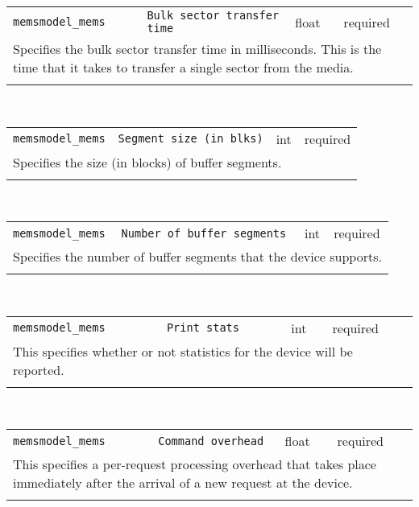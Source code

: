 \noindent 
\begin{tabular}{|p{\lpmodwidth}|p{\lpnamewidth}|p{0.5in}|p{0.5in}|}
\cline{1-4}
\texttt{memsmodel\_mems} & \texttt{Bulk sector transfer time} & float & required \\ 
\cline{1-4}
\multicolumn{4}{|p{6in}|}{
Specifies the bulk sector transfer time in milliseconds. This is the
time that it takes to transfer a single sector from the media.
}\\ 
\cline{1-4}
\multicolumn{4}{p{5in}}{}\\
\end{tabular}\\ 
\noindent 
\begin{tabular}{|p{\lpmodwidth}|p{\lpnamewidth}|p{0.5in}|p{0.5in}|}
\cline{1-4}
\texttt{memsmodel\_mems} & \texttt{Segment size (in blks)} & int & required \\ 
\cline{1-4}
\multicolumn{4}{|p{6in}|}{
Specifies the size (in blocks) of buffer segments.
}\\ 
\cline{1-4}
\multicolumn{4}{p{5in}}{}\\
\end{tabular}\\ 
\noindent 
\begin{tabular}{|p{\lpmodwidth}|p{\lpnamewidth}|p{0.5in}|p{0.5in}|}
\cline{1-4}
\texttt{memsmodel\_mems} & \texttt{Number of buffer segments} & int & required \\ 
\cline{1-4}
\multicolumn{4}{|p{6in}|}{
Specifies the number of buffer segments that the device supports.
}\\ 
\cline{1-4}
\multicolumn{4}{p{5in}}{}\\
\end{tabular}\\ 
\noindent 
\begin{tabular}{|p{\lpmodwidth}|p{\lpnamewidth}|p{0.5in}|p{0.5in}|}
\cline{1-4}
\texttt{memsmodel\_mems} & \texttt{Print stats} & int & required \\ 
\cline{1-4}
\multicolumn{4}{|p{6in}|}{
This specifies whether or not statistics for the device will be reported.
}\\ 
\cline{1-4}
\multicolumn{4}{p{5in}}{}\\
\end{tabular}\\ 
\noindent 
\begin{tabular}{|p{\lpmodwidth}|p{\lpnamewidth}|p{0.5in}|p{0.5in}|}
\cline{1-4}
\texttt{memsmodel\_mems} & \texttt{Command overhead} & float & required \\ 
\cline{1-4}
\multicolumn{4}{|p{6in}|}{
This specifies a per-request processing overhead that takes place
immediately after the arrival of a new request at the device.
}\\ 
\cline{1-4}
\multicolumn{4}{p{5in}}{}\\
\end{tabular}\\ 
